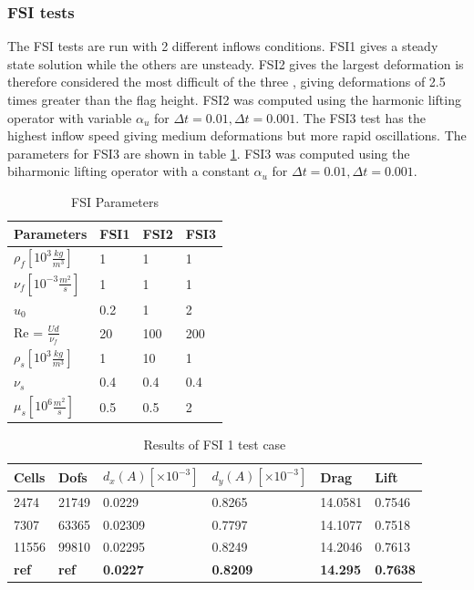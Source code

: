 \subsubsection*{FSI tests}
The FSI tests are run with 2 different inflows conditions. FSI1 gives a steady state solution while the others are unsteady. FSI2 gives the largest deformation is therefore considered the most difficult of the three \cite{Richter2013}, giving deformations of 2.5 times greater than the flag height. FSI2 was computed using the harmonic lifting operator with variable $\alpha_u$ for $\Delta t = 0.01, \Delta t = 0.001$. The FSI3 test has the highest inflow speed giving medium deformations but more rapid oscillations. The parameters for FSI3 are shown in table \ref{FSI_para}. FSI3 was computed using the biharmonic lifting operator with a constant  $\alpha_u$ for $\Delta t = 0.01, \Delta t = 0.001$.


\begin{table}[h!]
\centering
\caption{FSI Parameters}
\label{FSI_para}
\begin{tabular}{|l|l|l|l|}
\hline
Parameters & FSI1 & FSI2 & FSI3 \\ \hline
$\rho_f[10^3 \frac{kg}{m^3}]$ & 1 & 1 & 1 \\ \hline
$\nu_f [10^{-3} \frac{m^2}{s}]$ & 1 & 1 & 1 \\ \hline
$u_0$ & 0.2 & 1 & 2 \\ \hline
Re = $\frac{U d}{\nu_f}$ & 20 & 100 & 200 \\ \hline
$\rho_s[10^3 \frac{kg}{m^3}]$ & 1 & 10 & 1 \\ \hline
$\nu_s$ & 0.4 & 0.4 & 0.4 \\ \hline
$\mu_s[10^6 \frac{m^2}{s}]$ & 0.5 & 0.5 & 2 \\ \hline
\end{tabular}
\end{table}

\begin{table}[H]
\centering
\caption{Results of FSI 1 test case}
\label{my-label}
\begin{tabular}{|l|l|l|l|l|l|}
\hline
Cells & Dofs & $d_x(A) [\times10^{-3}]$ & $d_y(A)[\times10^{-3}]$ & Drag & Lift \\ \hline
2474 & 21749 & 0.0229 & 0.8265 & 14.0581 & 0.7546 \\ \hline
7307 & 63365 & 0.02309 & 0.7797 & 14.1077 & 0.7518 \\ \hline
11556 & 99810 & 0.02295 & 0.8249 & 14.2046 & 0.7613 \\ \hline
\textbf{ref} & \textbf{ref} & \textbf{0.0227} & \textbf{0.8209} & \textbf{14.295} & \textbf{0.7638} \\ \hline
\end{tabular}
\end{table}

